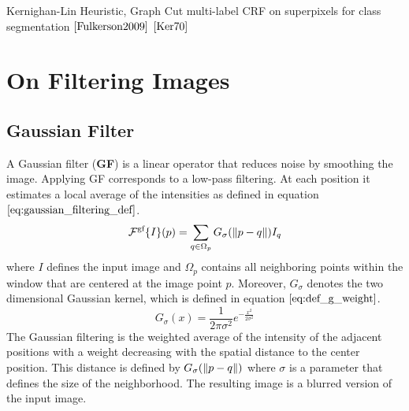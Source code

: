 Kernighan-Lin Heuristic, Graph Cut
multi-label CRF on superpixels for class segmentation $\cite{Fulkerson2009}$
$\cite{Ker70}$


\section{On Filtering Images}
\subsection{Gaussian Filter}

A Gaussian filter (\textbf{GF}) is a linear operator that reduces noise by smoothing the image. Applying GF corresponds to a low-pass filtering.
At each position it estimates a local average of the intensities as defined in equation $\ref{eq:gaussian_filtering_def}$.
\begin{equation}
	\mathcal{F}^{\text{gf}} \{I \} (p) = \sum_{q \in \Omega_p} G_{\sigma} (\left\lVert p - q\right\rVert) I_q
\label{eq:gaussian_filtering_def}
\end{equation}
where $I$ defines the input image and $\Omega_p$ contains all neighboring points within the window that are centered at the image point $p$. Moreover, $G_{\sigma}$ denotes the two dimensional Gaussian kernel, which is defined in equation $\ref{eq:def_g_weight}$.
\begin{equation}
	G_{\sigma} (x) = \frac{1}{2 \pi \sigma^2} e^{-\frac{x^2}{2 \sigma^2}}
\label{eq:def_g_weight}
\end{equation}
The Gaussian filtering is the weighted average of the intensity of the adjacent positions with a weight decreasing with the spatial distance to the center position. This distance is defined by $G_{\sigma} (\left\lVert p - q\right\rVert)$ where $\sigma$ is a parameter that defines the size of the neighborhood. The resulting image is a blurred version of the input image.

